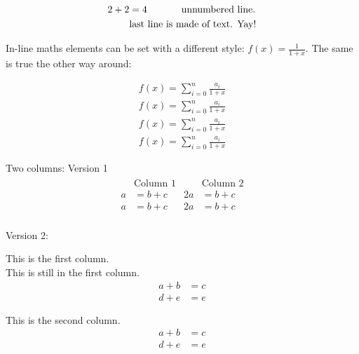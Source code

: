\documentclass[12pt, a4paper, twopage]{scrartcl}
\begin{document}
\begin{align}
	 \nonumber  2 + 2 &= 4 \text{ \hspace{1cm} unnumbered line.}\\
	 &\text{last line is made of text. Yay!}
\end{align}




In-line maths elements can be set with a different style: \(f(x) = \displaystyle \frac{1}{1+x}\). The same is true the other way around:

\begin{eqnarray*}
	f(x) = \sum_{i=0}^{n} \frac{a_i}{1+x} \\
	\textstyle f(x) = \textstyle \sum_{i=0}^{n} \frac{a_i}{1+x} \\
	\scriptstyle f(x) = \scriptstyle \sum_{i=0}^{n} \frac{a_i}{1+x} \\
	\scriptscriptstyle f(x) = \scriptscriptstyle \sum_{i=0}^{n} \frac{a_i}{1+x}
\end{eqnarray*}


Two columns: Version 1
\begin{align}
	\begin{split}
		&\text{Column 1}\\
		a &= b+c\\
		a &= b+c\\
	\end{split}
	\begin{split}
		& \text{Column 2}\\
		2a &= b+c\\
		2a &= b+c\\
	\end{split}
\end{align}

Version 2:

\begin{minipage}[t]{0.4\textwidth}
	This is the first column.\\
	
	This is still in the first column.
	\begin{align}
	a+b &= c\\
	d+e &= e
	\end{align}
\end{minipage}
%
%
\begin{minipage}[t]{0.4\textwidth}
	This is the second column.
	\begin{align}
	a+b &= c\\
	d+e &= e
	\end{align}
\end{minipage}
\end{document}
